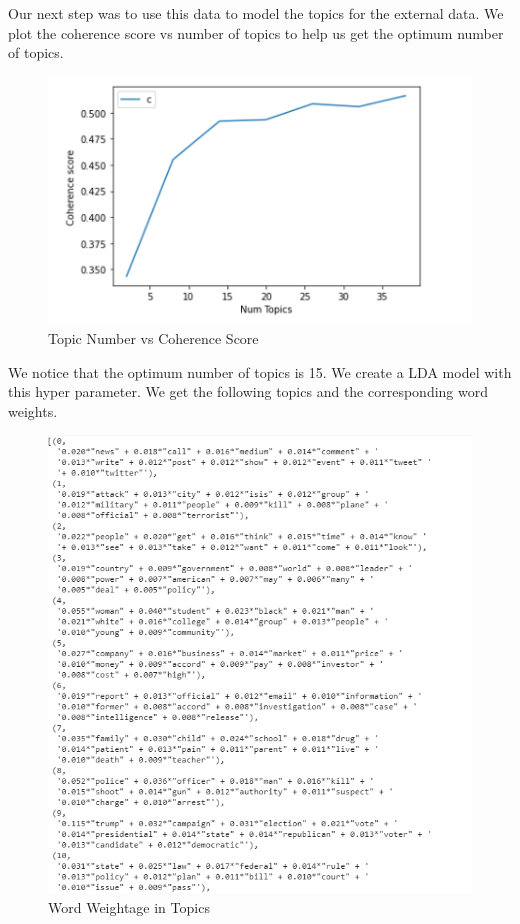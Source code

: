 \documentclass{article}
\begin{document}
Our next step was to use this data to model the topics for the external data. We plot the coherence score vs number of topics to help us get the optimum number of topics.

\begin{figure}[H]
    \centering
    \includegraphics[scale=1.5]{score.PNG}
    \caption{Topic Number vs Coherence Score}
    \label{Topic Number vs Coherence Scorel}
\end{figure}

We notice that the optimum number of topics is 15. We create a LDA model with this hyper parameter. We get the following topics and the corresponding word weights.

\begin{figure}[H]
    \centering
    \includegraphics[scale=0.8]{NeuRIPS2019/words.PNG}
    \caption{Word Weightage in Topics}
    \label{Word Weightage in Topics}
\end{figure}
\end{document}
